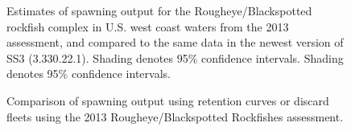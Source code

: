 \documentclass[
]{scrartcl}
\begin{document}
\begin{figure}


\caption{\label{fig-SO_2013}Estimates of spawning output for the
Rougheye/Blackspotted rockfish complex in U.S. west coast waters from
the 2013 assessment, and compared to the same data in the newest version
of SS3 (3.330.22.1). Shading denotes 95\% confidence intervals. Shading
denotes 95\% confidence intervals.}

\end{figure}%

\begin{figure}


\caption{\label{fig-Discard_comp_SO}Comparison of spawning output using
retention curves or discard fleets using the 2013 Rougheye/Blackspotted
Rockfishes assessment.}

\end{figure}%
\end{document}
